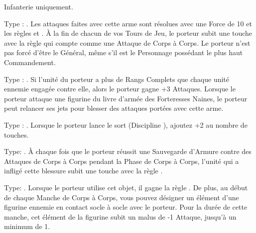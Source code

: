 \closearmyarmoury






\startarmymagicalitems

\armymagicalweapons

\startpricelist

Infanterie uniquement. %

Type : \hw{}. Les attaques faites avec cette arme sont résolues avec une Force de 10 et les règles \divineattacks{} et . À la fin de chacun de vos Tours de Jeu, le porteur subit une touche avec la règle \toxicattacks{} qui compte comme une Attaque de Corps à Corps. Le porteur n'est pas forcé d'être le Général, même s'il est le Personnage possédant le plus haut Commandement.

Type : \hw{}. Si l'unité du porteur a plus de Rangs Complets que chaque unité ennemie engagée contre elle, alors le porteur gagne +3 Attaques. Lorsque le porteur attaque une figurine du livre d'armée des Forteresses Naines, le porteur peut relancer ses jets pour blesser des attaques portées avec cette arme.

Type : \halberd{}. Lorsque le porteur lance le sort \ruinsignature{} (Discipline \ruin{}), ajoutez +2 au nombre de touches.

\endpricelist

\armymagicalarmour

\startpricelist

Type: \platearmour{}. À chaque fois que le porteur réussit une Sauvegarde d'Armure contre des Attaques de Corps à Corps pendant la Phase de Corps à Corps, l'unité qui a infligé cette blessure subit une touche avec la règle \toxicattacks{}.

Type: \shield{}. Lorsque le porteur utilise cet objet, il gagne la règle \distracting{}. De plus, au début de chaque Manche de Corps à Corps, vous pouvez désigner un élément d'une figurine ennemie en contact socle à socle avec le porteur. Pour la durée de cette manche, cet élément de la figurine subit un malus de -1 Attaque, jusqu'à un minimum de 1.
\endpricelist

